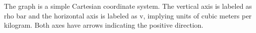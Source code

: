 The graph is a simple Cartesian coordinate system. The vertical axis is labeled as rho bar and the horizontal axis is labeled as v, implying units of cubic meters per kilogram. Both axes have arrows indicating the positive direction.